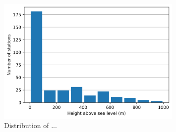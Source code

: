 \begin{figure}[ht]
    \centering
    \includegraphics[width=0.8\textwidth]{Figures/station_heights.png}
    \caption[Distribution of weather station heights above see level]{Distribution of ...}
    \label{fig:station_heights}
\end{figure}